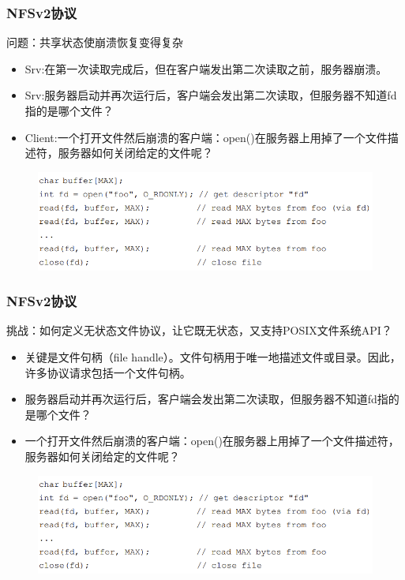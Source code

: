 \begin{frame}[fragile]
    \frametitle{NFSv2协议}
    问题：共享状态使崩溃恢复变得复杂
    \begin{itemize}
        \item Srv:在第一次读取完成后，但在客户端发出第二次读取之前，服务器崩溃。
        \item Srv:服务器启动并再次运行后，客户端会发出第二次读取，但服务器不知道fd指的是哪个文件？
        \item Client:一个打开文件然后崩溃的客户端：open()在服务器上用掉了一个文件描述符，服务器如何关闭给定的文件呢？
    \end{itemize}
    \begin{figure}
        \includegraphics[width=0.8\linewidth]{figs/stateful-code.png}
    \end{figure}

\end{frame}

\begin{frame}[fragile]
    \frametitle{NFSv2协议}
    挑战：如何定义无状态文件协议，让它既无状态，又支持POSIX文件系统API？\pause
    \begin{itemize}
        \item 关键是文件句柄（file handle）。文件句柄用于唯一地描述文件或目录。因此，许多协议请求包括一个文件句柄。        
        \item 服务器启动并再次运行后，客户端会发出第二次读取，但服务器不知道fd指的是哪个文件？
        \item 一个打开文件然后崩溃的客户端：open()在服务器上用掉了一个文件描述符，服务器如何关闭给定的文件呢？
    \end{itemize}
    \begin{figure}
        \includegraphics[width=0.8\linewidth]{figs/stateful-code.png}
    \end{figure}
    
\end{frame}


